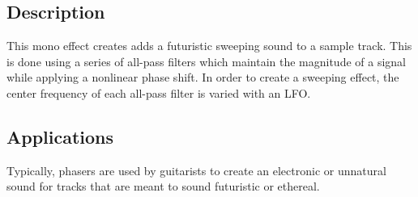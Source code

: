 \subsection{Description}
This mono effect creates adds a futuristic sweeping sound to a sample track. This is done using a series of all-pass filters which maintain the magnitude of a signal while applying a nonlinear phase shift. In order to create a sweeping effect, the center frequency of each all-pass filter is varied with an LFO.

\subsection{Applications}
Typically, phasers are used by guitarists to create an electronic or unnatural sound for tracks that are meant to sound futuristic or ethereal.

